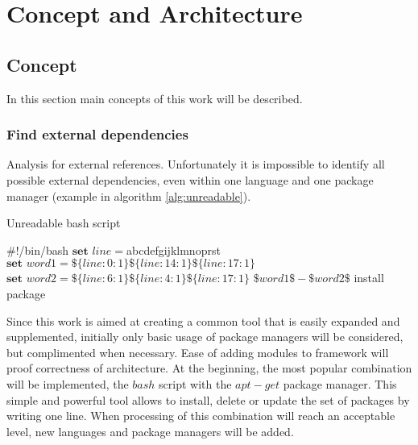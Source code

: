 
\chapter{Concept and Architecture}\label{chap:conarch}
\section{Concept}
In this section main concepts of this work will be described.
\subsection*{Find external dependencies}
Analysis for external references.
Unfortunately it is impossible to identify all possible external dependencies, even within one language and one package manager (example in algorithm \ref{alg:unreadable}).
\begin{Algorithmus} 
	\caption{Unreadable bash script}
	\label{alg:unreadable}
	\begin{algorithmic}
		\State	\#!/bin/bash
		\State	$\textbf{set } line = $abcdefgijklmnoprst
		\State	$\textbf{set } word1 = \$\{line:0:1\}\$\{line:14:1\}\$\{line:17:1\}$ 
		\State  $\textbf{set } word2 = \$\{line:6:1\}\$\{line:4:1\}\$\{line:17:1\}$
		\State  $\$word1\$-\$word2\$$ install package
	\end{algorithmic}
\end{Algorithmus}
Since this work is aimed at creating a common tool that is easily expanded and supplemented, initially only basic usage of package managers will be considered, but complimented when necessary. 
Ease of adding modules to framework will proof correctness of architecture.
At the beginning, the most popular combination will be implemented, the $bash$ script with the $apt-get$ package manager.
This simple and powerful tool allows to install, delete or update the set of packages by writing one line.
When processing of this combination will reach an acceptable level, new languages and package managers will be added.
